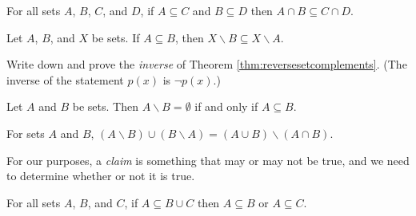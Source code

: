\begin{theorem} For all sets $A$, $B$, $C$, and $D$, if $A\subseteq C$ and $B\subseteq D$ then $A\cap B \subseteq C\cap D$.
\end{theorem}

\begin{theorem} \label{thm:reversesetcomplements}Let $A$, $B$, and $X$ be sets. If $A \subseteq B$, then $X \smallsetminus B \subseteq X \smallsetminus A$.
\end{theorem}

\begin{exercise} Write down and prove the \textit{inverse} of Theorem \ref{thm:reversesetcomplements}. (The inverse of the statement $p(x)$ is $\neg p(x)$.)
\end{exercise}

\begin{theorem} Let $A$ and $B$ be sets. Then $A\smallsetminus B = \emptyset$ if and only if $A \subseteq B$.
\end{theorem}

\begin{theorem} For sets $A$ and $B$, $(A\smallsetminus B)\cup (B\smallsetminus A) = (A\cup B) \smallsetminus (A\cap B)$.
\end{theorem}

For our purposes, a \textit{claim} is something that may or may not be true, and we need to determine whether or not it is true.

\begin{claim} For all sets $A$, $B$, and $C$, if $A \subseteq B\cup C$ then $A\subseteq B$ or $A\subseteq C$.
\end{claim}

